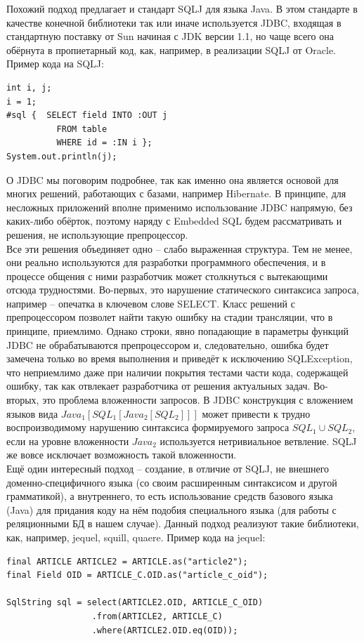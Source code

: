\documentclass[12pt]{article}
\begin{document}
Похожий подход предлагает и стандарт SQLJ для языка Java. В этом стандарте в качестве конечной библиотеки так или иначе используется JDBC, входящая в стандартную поставку от Sun начиная с JDK версии 1.1, но чаще всего она обёрнута в пропиетарный код, как, например, в реализации SQLJ от Oracle. Пример кода на SQLJ:
\begin{lstlisting}
int i, j;
i = 1;
#sql {	SELECT field INTO :OUT j
          FROM table
          WHERE id = :IN i };
System.out.println(j);
\end{lstlisting}
О JDBC мы поговорим подробнее, так как именно она является основой для многих решений, работающих с базами, например Hibernate. В принципе, для несложных приложений вполне применимо использование JDBC напрямую, без каких-либо обёрток, поэтому наряду с Embedded SQL будем рассматривать и решения, не использующие препроцессор.\\

Все эти решения объединяет одно -- слабо выраженная структура. Тем не менее, они реально используются для разработки программного обеспечения, и в процессе общения с ними разработчик может столкнуться с вытекающими отсюда трудностями. Во-первых, это нарушение статического синтаксиса запроса, например -- опечатка в ключевом слове SELECT. Класс решений с препроцессором позволет найти такую ошибку на стадии трансляции, что в принципе, приемлимо. Однако строки, явно попадающие в параметры функций JDBC не обрабатываются препроцессором и, следовательно, ошибка будет замечена только во время выполнения и приведёт к исключению SQLException, что неприемлимо даже при наличии покрытия тестами части кода, содержащей ошибку, так как отвлекает разработчика от решения актуальных задач. Во-вторых, это проблема вложенности запросов. В JDBC конструкция с вложением языков вида $Java_1[SQL_1[Java_2[SQL_2]]]$ может привести к трудно воспроизводимому нарушению синтаксиса формируемого запроса $SQL_1 \cup SQL_2$, если на уровне вложенности $Java_2$ используется нетривиальное ветвление. SQLJ же вовсе исключает возможность такой вложенности.\\

Ещё один интересный подход -- создание, в отличие от SQLJ, не внешнего доменно-специфичного языка (со своим расширенным синтаксисом и другой грамматикой), а внутреннего, то есть использование средств базового языка (Java) для придания коду на нём подобия специального языка (для работы с реляционными БД в нашем случае). Данный подход реализуют такие библиотеки, как, например, jequel, squill, quaere. Пример кода на jequel:
\begin{lstlisting}
final ARTICLE ARTICLE2 = ARTICLE.as("article2");
final Field OID = ARTICLE_C.OID.as("article_c_oid");

SqlString sql = select(ARTICLE2.OID, ARTICLE_C_OID)
                 .from(ARTICLE2, ARTICLE_C)
                 .where(ARTICLE2.OID.eq(OID));
\end{lstlisting}
\end{document}
